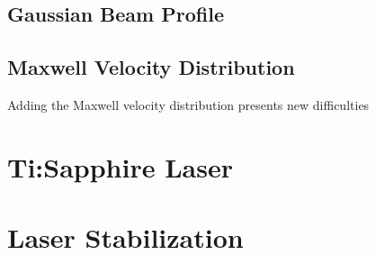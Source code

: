 \documentclass[prb,preprint]{revtex4-1}
\begin{document}
\subsection{Gaussian Beam Profile}

\subsection{Maxwell Velocity Distribution}

Adding the Maxwell velocity distribution presents new difficulties 
 
 

\section{Ti:Sapphire Laser}


\section{Laser Stabilization}




\begin{thebibliography}{0}



\end{thebibliography}
\end{document}
